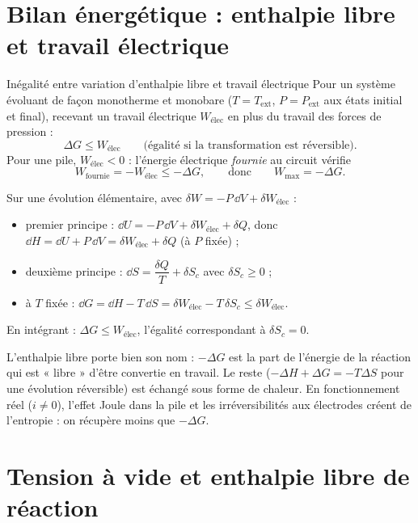\section{Bilan énergétique : enthalpie libre et travail électrique}

\begin{resultat}{Inégalité entre variation d'enthalpie libre et travail électrique}
Pour un système évoluant de façon monotherme et monobare ($T = T_{\text{ext}}$, $P = P_{\text{ext}}$ aux états initial et final), recevant un travail électrique $W_{\text{élec}}$ en plus du travail des forces de pression :
\[ \boxed{\Delta G \leq W_{\text{élec}}} \qquad\text{(égalité si la transformation est réversible).} \]
Pour une pile, $W_{\text{élec}} < 0$ : l'énergie électrique \emph{fournie} au circuit vérifie
\[ W_{\text{fournie}} = -W_{\text{élec}} \leq -\Delta G, \qquad\text{donc}\qquad W_{\max} = -\Delta G. \]
\end{resultat}

\begin{demo}
Sur une évolution élémentaire, avec $\delta W = -P\,\dd V + \delta W_{\text{élec}}$ :
\begin{itemize}
  \item premier principe : $\dd U = -P\,\dd V + \delta W_{\text{élec}} + \delta Q$, donc $\dd H = \dd U + P\,\dd V = \delta W_{\text{élec}} + \delta Q$ (à $P$ fixée) ;
  \item deuxième principe : $\dd S = \dfrac{\delta Q}{T} + \delta S_c$ avec $\delta S_c \geq 0$ ;
  \item à $T$ fixée : $\dd G = \dd H - T\,\dd S = \delta W_{\text{élec}} - T\,\delta S_c \leq \delta W_{\text{élec}}$.
\end{itemize}
En intégrant : $\Delta G \leq W_{\text{élec}}$, l'égalité correspondant à $\delta S_c = 0$.
\end{demo}

\noindent L'enthalpie libre porte bien son nom : $-\Delta G$ est la part de l'énergie de la réaction qui est « libre » d'être convertie en travail. Le reste ($-\Delta H + \Delta G = -T\Delta S$ pour une évolution réversible) est échangé sous forme de chaleur. En fonctionnement réel ($i \neq 0$), l'effet Joule dans la pile et les irréversibilités aux électrodes créent de l'entropie : on récupère moins que $-\Delta G$.

\section{Tension à vide et enthalpie libre de réaction}

